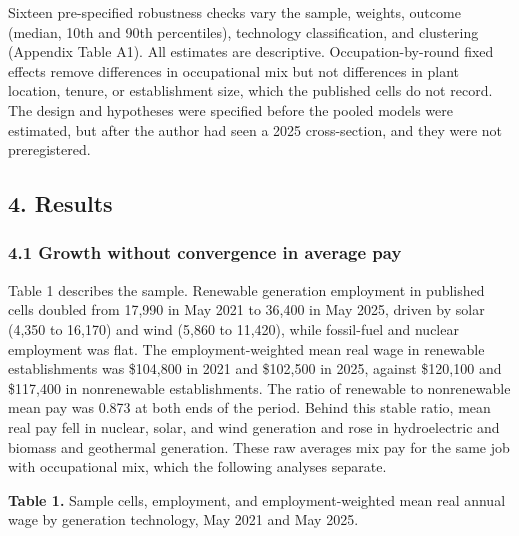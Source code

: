 \documentclass[
  11pt,
]{article}
\begin{document}
Sixteen pre-specified robustness checks vary the sample, weights,
outcome (median, 10th and 90th percentiles), technology classification,
and clustering (Appendix Table A1). All estimates are descriptive.
Occupation-by-round fixed effects remove differences in occupational mix
but not differences in plant location, tenure, or establishment size,
which the published cells do not record. The design and hypotheses were
specified before the pooled models were estimated, but after the author
had seen a 2025 cross-section, and they were not preregistered.

\subsection{4. Results}\label{results}

\subsubsection{4.1 Growth without convergence in average
pay}\label{growth-without-convergence-in-average-pay}

Table 1 describes the sample. Renewable generation employment in
published cells doubled from 17,990 in May 2021 to 36,400 in May 2025,
driven by solar (4,350 to 16,170) and wind (5,860 to 11,420), while
fossil-fuel and nuclear employment was flat. The employment-weighted
mean real wage in renewable establishments was \$104,800 in 2021 and
\$102,500 in 2025, against \$120,100 and \$117,400 in nonrenewable
establishments. The ratio of renewable to nonrenewable mean pay was
0.873 at both ends of the period. Behind this stable ratio, mean real
pay fell in nuclear, solar, and wind generation and rose in
hydroelectric and biomass and geothermal generation. These raw averages
mix pay for the same job with occupational mix, which the following
analyses separate.

\textbf{Table 1.} Sample cells, employment, and employment-weighted mean
real annual wage by generation technology, May 2021 and May 2025.
\end{document}
